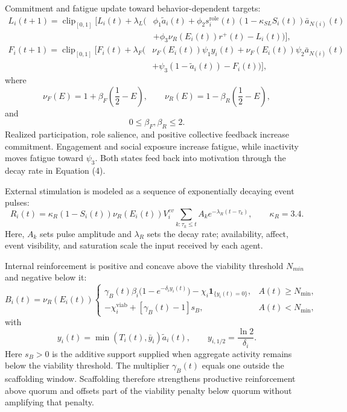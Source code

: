 \documentclass[11pt]{article}
\newcommand{\clip}{\operatorname{clip}_{[0,1]}}
\begin{document}
Commitment and fatigue update toward behavior-dependent targets:
\begin{equation}\tag{5}\label{eq:loyalty}
\begin{aligned}
L_i(t{+}1)=\clip\!\Big[L_i(t)+\lambda_L\big(&\phi_1\tilde a_i(t)+\phi_2s_i^{\mathrm{role}}(t)(1-\kappa_{SL}S_i(t))\bar a_{N(i)}(t)\\
&+\phi_3\nu_R(E_i(t))r^+(t)-L_i(t)\big)\Big],
\end{aligned}
\end{equation}
\begin{equation}\tag{6}\label{eq:fatigue}
\begin{aligned}
F_i(t{+}1)=\clip\!\Big[F_i(t)+\lambda_F\big(&\nu_F(E_i(t))\psi_1y_i(t)+\nu_F(E_i(t))\psi_2\bar a_{N(i)}(t)\\
&+\psi_3(1-\tilde a_i(t))-F_i(t)\big)\Big],
\end{aligned}
\end{equation}
where
\[
\nu_F(E)=1+\beta_F(\frac{1}{2}-E), \qquad
\nu_R(E)=1-\beta_R(\frac{1}{2}-E),
\]
and
\[
0\le \beta_F, \beta_R \le 2.
\]
Realized participation, role salience, and positive collective feedback increase commitment. Engagement and social exposure increase fatigue, while inactivity moves fatigue toward $\psi_3$. Both states feed back into motivation through the decay rate in Equation (4). 

External stimulation is modeled as a sequence of exponentially decaying event pulses: 
\begin{equation}\tag{7}\label{eq:external}
R_i(t)=\kappa_R(1-S_i(t))\nu_R(E_i(t))V^{ev}_i\sum_{k:\tau_k\le t} A_k e^{-\lambda_R(t-\tau_k)},
\qquad \kappa_R=3.4.
\end{equation}
Here, $A_k$ sets pulse amplitude and $\lambda_R$ sets the decay rate; availability, affect, event visibility, and saturation scale the input received by each agent. 

Internal reinforcement is positive and concave above the viability threshold $N_{min}$ and negative below it: 
\begin{equation}\tag{8}\label{eq:internal}
B_i(t)=\nu_R(E_i(t))
\begin{cases}
\gamma_B(t)\beta_i\big(1-e^{-\delta_i y_i(t)}\big)-\chi_i\mathbf 1_{\{y_i(t)=0\}}, & A(t)\ge N_{\min},\\[3pt]
-\chi_i^{\mathrm{viab}}+[\gamma_B(t)-1]s_B, & A(t)<N_{\min},
\end{cases}
\end{equation}
with
\begin{equation*}
y_i(t)=\min(T_i(t),\bar y_i)\tilde a_i(t),\qquad y_{i,{1/2}}=\frac{\ln 2}{\delta_i}.
\end{equation*}
Here $s_B>0$ is the additive support supplied when aggregate activity remains below the viability threshold. The multiplier $\gamma_B(t)$ equals one outside the scaffolding window. Scaffolding therefore strengthens productive reinforcement above quorum and offsets part of the viability penalty below quorum without amplifying that penalty.
\end{document}

